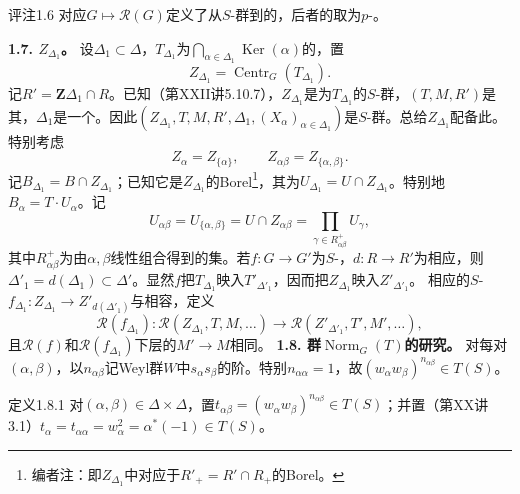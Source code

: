 \begin{SGAresult}{评注}{1.6}
对应$G\mapsto\mathcal R(G)$定义了从$S$-群到的，后者的取为$p$-。
\end{SGAresult}
\textbf{1.7. $Z_{\Delta_1}$。} 设$\Delta_1\subset\Delta$，$T_{\Delta_1}$为$\bigcap_{\alpha\in\Delta_1}\operatorname{Ker}(\alpha)$的，置
\[Z_{\Delta_1}=\operatorname{Centr}_G(T_{\Delta_1}).\]
记$R'=\mathbf Z\Delta_1\cap R$。已知（第XXII讲5.10.7），$Z_{\Delta_1}$是为$T_{\Delta_1}$的$S$-群，$(T,M,R')$是其，$\Delta_1$是一个。因此$(Z_{\Delta_1},T,M,R',\Delta_1,(X_\alpha)_{\alpha\in\Delta_1})$是$S$-群。总给$Z_{\Delta_1}$配备此。特别考虑
\[Z_\alpha=Z_{\{\alpha\}},\qquad Z_{\alpha\beta}=Z_{\{\alpha,\beta\}}.\]
记$B_{\Delta_1}=B\cap Z_{\Delta_1}$；已知它是$Z_{\Delta_1}$的Borel\footnote{编者注：即$Z_{\Delta_1}$中对应于$R'_+=R'\cap R_+$的Borel。}，其为$U_{\Delta_1}=U\cap Z_{\Delta_1}$。特别地$B_\alpha=T\cdot U_\alpha$。记
\[U_{\alpha\beta}=U_{\{\alpha,\beta\}}=U\cap Z_{\alpha\beta}=\prod_{\gamma\in R^+_{\alpha\beta}}U_\gamma,\]
其中$R^+_{\alpha\beta}$为由$\alpha,\beta$线性组合得到的集。若$f:G\to G'$为$S$-，$d:R\to R'$为相应，则$\Delta'_1=d(\Delta_1)\subset\Delta'$。显然$f$把$T_{\Delta_1}$映入$T'_{\Delta'_1}$，因而把$Z_{\Delta_1}$映入$Z'_{\Delta'_1}$。
相应的$S$-$f_{\Delta_1}:Z_{\Delta_1}\to Z'_{d(\Delta'_1)}$与相容，定义
\[\mathcal R(f_{\Delta_1}):\mathcal R(Z_{\Delta_1},T,M,\ldots)\longrightarrow\mathcal R(Z'_{\Delta'_1},T',M',\ldots),\]
且$\mathcal R(f)$和$\mathcal R(f_{\Delta_1})$下层的$M'\to M$相同。
\textbf{1.8. 群$\operatorname{Norm}_G(T)$的研究。} 对每对$(\alpha,\beta)$，以$n_{\alpha\beta}$记Weyl群$W$中$s_\alpha s_\beta$的阶。特别$n_{\alpha\alpha}=1$，故$(w_\alpha w_\beta)^{n_{\alpha\beta}}\in T(S)$。
\begin{SGAresult}{定义}{1.8.1}
对$(\alpha,\beta)\in\Delta\times\Delta$，置$t_{\alpha\beta}=(w_\alpha w_\beta)^{n_{\alpha\beta}}\in T(S)$；并置（第XX讲3.1）$t_\alpha=t_{\alpha\alpha}=w_\alpha^2=\alpha^*(-1)\in T(S)$。
\end{SGAresult}
